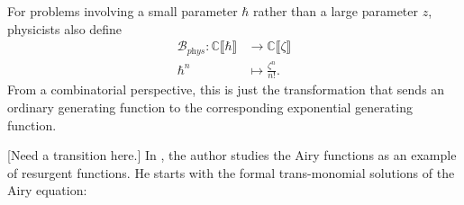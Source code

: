\documentclass{article}
\newcommand{\maps}{\colon}
\newcommand{\C}{\mathbb{C}}
\newcommand{\borel}{\mathcal{B}}
\theoremstyle{definition}
\theoremstyle{plain}
\newenvironment{todo}{\color{Coral}}{\color{black}}
\begin{document}
For problems involving a small parameter $\hbar$ rather than a large parameter $z$, physicists also define
\begin{align*}
\borel_{\textit{phys}} \maps \C \llbracket \hbar \rrbracket & \to \C \llbracket \zeta \rrbracket \\
\hbar^n & \mapsto \frac{\zeta^n}{n!}.
\end{align*}
From a combinatorial perspective, this is just the transformation that sends an ordinary generating function to the corresponding exponential generating function.

\begin{todo}[Need a transition here.]\end{todo} In \cite{lectures-Marino}, the author studies the Airy functions as an example of resurgent functions. He starts with the formal trans-monomial solutions of the Airy equation:
\end{document}
